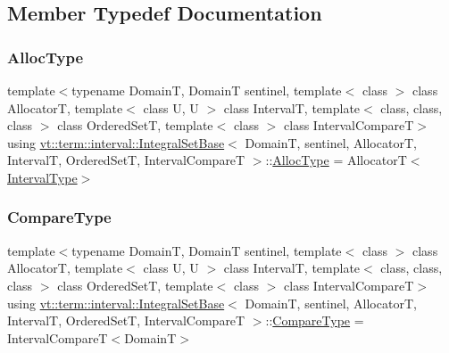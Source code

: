 \subsection{Member Typedef Documentation}
\mbox{\label{structvt_1_1term_1_1interval_1_1_integral_set_base_af699b4961903ebe28d478088eae9b60a}} 
\subsubsection{\texorpdfstring{Alloc\+Type}{AllocType}}
{\footnotesize\ttfamily template$<$typename DomainT, DomainT sentinel, template$<$ class $>$ class AllocatorT, template$<$ class U, U $>$ class IntervalT, template$<$ class, class, class $>$ class Ordered\+SetT, template$<$ class $>$ class Interval\+CompareT$>$ \\
using \hyperlink{structvt_1_1term_1_1interval_1_1_integral_set_base}{vt\+::term\+::interval\+::\+Integral\+Set\+Base}$<$ DomainT, sentinel, AllocatorT, IntervalT, Ordered\+SetT, Interval\+CompareT $>$\+::\hyperlink{structvt_1_1term_1_1interval_1_1_integral_set_base_af699b4961903ebe28d478088eae9b60a}{Alloc\+Type} =  AllocatorT$<$\hyperlink{structvt_1_1term_1_1interval_1_1_integral_set_base_a1f8f5bb84064be35bbaaf15bb5a43f14}{Interval\+Type}$>$}

\mbox{\label{structvt_1_1term_1_1interval_1_1_integral_set_base_a8788c1d68e2b4348c341c120363c95e7}} 
\subsubsection{\texorpdfstring{Compare\+Type}{CompareType}}
{\footnotesize\ttfamily template$<$typename DomainT, DomainT sentinel, template$<$ class $>$ class AllocatorT, template$<$ class U, U $>$ class IntervalT, template$<$ class, class, class $>$ class Ordered\+SetT, template$<$ class $>$ class Interval\+CompareT$>$ \\
using \hyperlink{structvt_1_1term_1_1interval_1_1_integral_set_base}{vt\+::term\+::interval\+::\+Integral\+Set\+Base}$<$ DomainT, sentinel, AllocatorT, IntervalT, Ordered\+SetT, Interval\+CompareT $>$\+::\hyperlink{structvt_1_1term_1_1interval_1_1_integral_set_base_a8788c1d68e2b4348c341c120363c95e7}{Compare\+Type} =  Interval\+CompareT$<$DomainT$>$}

